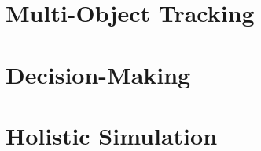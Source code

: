 \section{Multi-Object Tracking}
\label{sec:5_mot}

\section{Decision-Making}
\label{sec:5_decision_making}

\section{Holistic Simulation}
\label{sec:5_simulation}